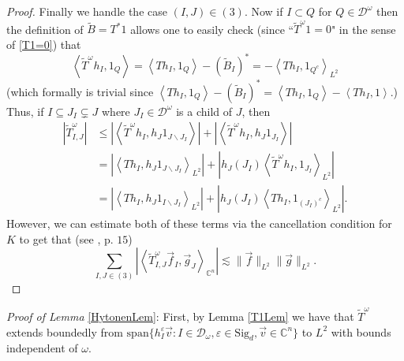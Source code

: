 \documentclass[12pt,reqno ]{amsart}
\numberwithin{equation}{section}
\theoremstyle{definition}
\newcommand{\C}{\ensuremath{\mathbb{C}^n}}
\newcommand{\Ew}{\ensuremath{\mathbb{E}_\omega}}
\newcommand{\D}{\ensuremath{\mathscr{D}}}
\newcommand{\Span}{\text{span}}
\newcommand{\V}[1]{\ensuremath{\vec{#1}}}
\newcommand{\ip}[2]{\ensuremath{\left\langle#1,#2\right\rangle}}
\newcommand{\W}[1]{\ensuremath{\widetilde{#1}}}
\renewcommand{\S}{\ensuremath{\text{Sig}_d}}
\begin{document}
\begin{proof}
Finally we handle the case $(I, J) \in (3)$. Now if $I \subset Q$ for $Q \in \D^\omega$  then the definition of $\W{B} = T^* 1$ allows one to easily check (since ``$\W{T}^\omega 1 = 0$" in the sense of \eqref{T1=0}) that \begin{equation*} \ip{\W{T}^\omega h_I}{1_Q}  = \ip{T h_I}{1_Q} - (\W{B}_I)^*   = -\ip{Th_I}{1_{Q^c}}_{L^2} \end{equation*} (which formally is trivial since $\ip{T h_I}{1_Q} - (\W{B}_I)^* = \ip{T h_I}{1_Q}  - \ip{Th_I}{1}$.)  Thus, if $I \subseteq J_I \subsetneq J$ where $J_I \in \D^\omega$ is a child of $J$, then \begin{align*} |\W{T}^\omega _{I, J}|   & \leq |\ip{\W{T}^\omega h_I}{h_J 1_{J \backslash J_I}}| + |\ip{\W{T}^\omega h_I}{h_J 1_{ J_I}}|  \\ & = |\ip{{T} h_I}{h_J 1_{J \backslash J_I}}_{L^2}| + |h_J(J_I) \ip{\W{T}^\omega h_I}{ 1_{  J_I}}_{L^2}| \\ & = |\ip{T h_I}{h_J 1_{I \backslash J_I}}_{L^2}| + |h_J(J_I) \ip{T h_I}{ 1_{ (J_I)^c}}_{L^2}|. \end{align*}  However, we can estimate both of these terms via the cancellation condition for $K$ to get that (see \cite{CT}, p. $15$) \begin{equation*} \sum_{I, J \in (3)} |\ip{\W{T}^\omega _{I, J}\V{f}_{I}}{\V{g}_J}_{\C} | \lesssim \|\V{f}\|_{L^2} \|\V{g}\|_{L^2}. \end{equation*}
\end{proof}





\noindent \textit{Proof of Lemma} \ref{HytonenLem}:
First, by Lemma \ref{T1Lem} we have that $\W{T}^\omega$ extends boundedly from $\Span \{h_I ^\varepsilon \V{v}: I \in \D_\omega, \varepsilon \in \S, \V{v} \in \C\}$ to $L^2$ with bounds independent of $\omega$.
\end{document}

